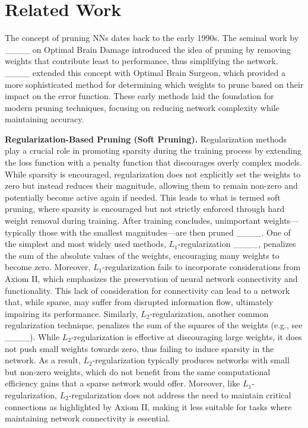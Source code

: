 \section{Related Work}
The concept of pruning NNs dates back to the early 1990s. The seminal work by ____ on Optimal Brain Damage introduced the idea of pruning by removing weights that contribute least to performance, thus simplifying the network. ____ extended this concept with Optimal Brain Surgeon, which provided a more sophisticated method for determining which weights to prune based on their impact on the error function. These early methods laid the foundation for modern pruning techniques, focusing on reducing network complexity while maintaining accuracy.



\textbf{Regularization-Based Pruning (Soft Pruning).} 
Regularization methods play a crucial role in promoting sparsity during the training process by extending the loss function with a penalty function that discourages overly complex models.
While sparsity is encouraged, regularization does not explicitly set the weights to zero but instead reduces their magnitude, allowing them to remain non-zero and potentially become active again if needed.
This leads to what is termed soft pruning, where sparsity is encouraged but not strictly enforced through hard weight removal during training. After training concludes, unimportant weights—typically those with the smallest magnitudes—are then pruned ____.
One of the simplest and most widely used methods, $L_1$-regularization ____, penalizes the sum of the absolute values of the weights, encouraging many weights to become zero. Moreover, $L_1$-regularization fails to incorporate considerations from Axiom II, which emphasizes the preservation of neural network connectivity and functionality. This lack of consideration for connectivity can lead to a network that, while sparse, may suffer from disrupted information flow, ultimately impairing its performance.
Similarly, $L_2$-regularization, another common regularization technique, penalizes the sum of the squares of the weights (e.g., see ____). 
While $L_2$-regularization is effective at discouraging large weights, it does not push small weights towards zero, thus failing to induce sparsity in the network. As a result, $L_2$-regularization typically produces networks with small but non-zero weights, which do not benefit from the same computational efficiency gains that a sparse network would offer. Moreover, like $L_1$-regularization, $L_2$-regularization does not address the need to maintain critical connections as highlighted by Axiom II, making it less suitable for tasks where maintaining network connectivity is essential.

